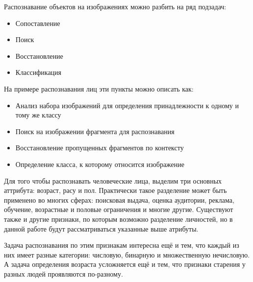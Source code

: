 \documentclass[12pt,a4paper]{article}
\begin{document}
Распознавание объектов на изображениях можно разбить на ряд подзадач:
\begin{itemize}
    \item Сопоставление
    \item Поиск
    \item Восстановление
    \item Классификация
\end{itemize}

На примере распознавания лиц эти пункты можно описать как:
\begin{itemize}
    \item Анализ набора изображений для определения принадлежности к одному и тому же классу
    \item Поиск на изображении фрагмента для распознавания
    \item Восстановление пропущенных фрагментов по контексту
    \item Определение класса, к которому относится изображение
\end{itemize}

Для того чтобы распознавать человеческие лица, выделим три основных аттрибута: возраст, расу и пол. Практически такое разделение может быть применено во многих сферах: поисковая выдача, оценка аудитории, реклама, обучение, возрастные и половые ограничения и многие другие. Существуют также и другие признаки, по которым возможно разделение личностей, но в данной работе будут рассматриваться указанные выше атрибуты.

Задача распознавания по этим признакам интересна ещё и тем, что каждый из них имеет разные категории: числовую, бинарную и множественную нечисловую. А задача определения возраста усложняется ещё и тем, что признаки старения у разных людей проявляются по-разному.
\end{document}

